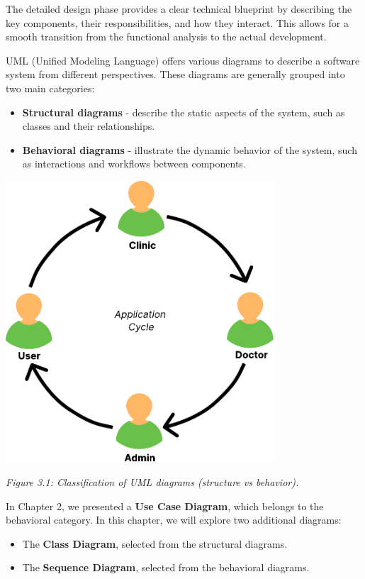 \documentclass[12pt]{report}
\begin{document}
\noindent The detailed design phase provides a clear technical blueprint by describing the key components, their responsibilities, and how they interact. This allows for a smooth transition from the functional analysis to the actual development.

\noindent UML (Unified Modeling Language) offers various diagrams to describe a software system from different perspectives. These diagrams are generally grouped into two main categories:

\begin{itemize}
    \item \textbf{Structural diagrams} - describe the static aspects of the system, such as classes and their relationships.
    \item \textbf{Behavioral diagrams} - illustrate the dynamic behavior of the system, such as interactions and workflows between components.
\end{itemize}

\begin{center}
    \includegraphics[width=10cm]{images/appcucle@2x.pdf}
\end{center}

\textit{Figure 3.1: Classification of UML diagrams (structure vs behavior).}

\noindent In Chapter 2, we presented a \textbf{Use Case Diagram}, which belongs to the behavioral category. In this chapter, we will explore two additional diagrams:
\begin{itemize}
    \item The \textbf{Class Diagram}, selected from the structural diagrams.
    \item The \textbf{Sequence Diagram}, selected from the behavioral diagrams.
\end{itemize}
\end{document}

